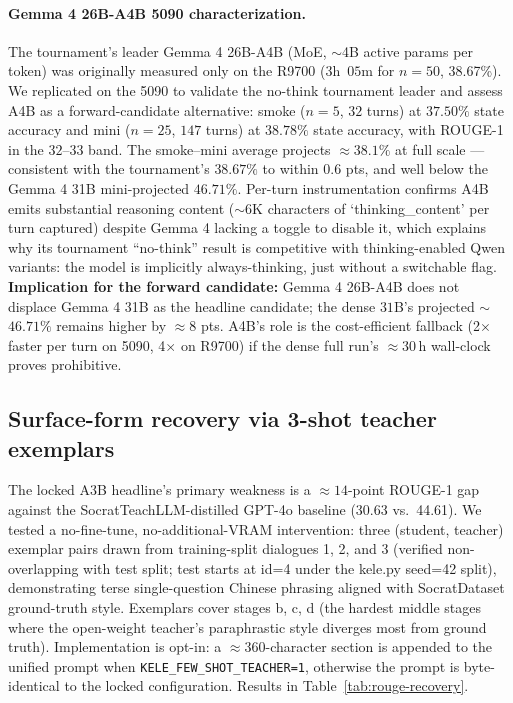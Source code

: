 \documentclass[11pt]{article}
\begin{document}
\paragraph{Gemma 4 26B-A4B 5090 characterization.}
The tournament's leader Gemma 4 26B-A4B (MoE, $\sim$4B active params per token) was originally measured only on the R9700 ($3$h~$05$m for $n{=}50$, 38.67\%). We replicated on the 5090 to validate the no-think tournament leader and assess A4B as a forward-candidate alternative: smoke ($n{=}5$, $32$ turns) at $37.50\%$ state accuracy and mini ($n{=}25$, $147$ turns) at $\mathbf{38.78\%}$ state accuracy, with ROUGE-1 in the $32$--$33$ band. The smoke--mini average projects $\approx 38.1\%$ at full scale --- consistent with the tournament's $38.67\%$ to within $0.6$ pts, and well below the Gemma 4 31B mini-projected $46.71\%$. Per-turn instrumentation confirms A4B emits substantial reasoning content ($\sim$6K characters of `thinking\_content' per turn captured) despite Gemma 4 lacking a toggle to disable it, which explains why its tournament ``no-think'' result is competitive with thinking-enabled Qwen variants: the model is implicitly always-thinking, just without a switchable flag. \textbf{Implication for the forward candidate:} Gemma 4 26B-A4B does not displace Gemma 4 31B as the headline candidate; the dense $31$B's projected $\sim$$46.71\%$ remains higher by $\approx 8$ pts. A4B's role is the cost-efficient fallback (2$\times$ faster per turn on 5090, 4$\times$ on R9700) if the dense full run's $\approx 30$\,h wall-clock proves prohibitive.

\subsection{Surface-form recovery via 3-shot teacher exemplars}
\label{sec:rouge-recovery}

The locked A3B headline's primary weakness is a $\approx 14$-point ROUGE-1 gap against the SocratTeachLLM-distilled GPT-4o baseline (30.63 vs.\ 44.61). We tested a no-fine-tune, no-additional-VRAM intervention: three (student, teacher) exemplar pairs drawn from training-split dialogues 1, 2, and 3 (verified non-overlapping with test split; test starts at id=4 under the kele.py seed=42 split), demonstrating terse single-question Chinese phrasing aligned with SocratDataset ground-truth style. Exemplars cover stages b, c, d (the hardest middle stages where the open-weight teacher's paraphrastic style diverges most from ground truth). Implementation is opt-in: a $\approx 360$-character section is appended to the unified prompt when \texttt{KELE\_FEW\_SHOT\_TEACHER=1}, otherwise the prompt is byte-identical to the locked configuration. Results in Table~\ref{tab:rouge-recovery}.
\end{document}
